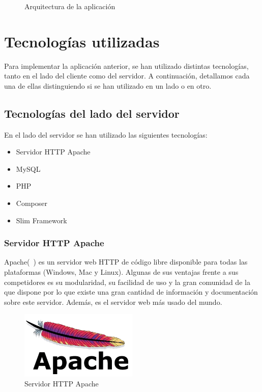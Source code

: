 \begin{figure}[htb]
\centering
\arquitectura
\caption{Arquitectura de la aplicación}
\label{fig:arquitectura}
\end{figure}

\section{Tecnologías utilizadas}

Para implementar la aplicación anterior, se han utilizado distintas tecnologías, tanto en el lado del cliente como del servidor. A continuación, detallamos cada una de ellas distinguiendo si se han utilizado en un lado o en otro.

\subsection{Tecnologías del lado del servidor}

En el lado del servidor se han utilizado las siguientes tecnologías:

\begin{itemize}
\item Servidor HTTP Apache
\item MySQL
\item PHP
\item Composer
\item Slim Framework
\end{itemize}

\subsubsection*{Servidor HTTP Apache}

Apache(~\cite{apache}) es un servidor web HTTP de código libre disponible para todas las plataformas (Windows, Mac y Linux). Algunas de sus ventajas frente a sus competidores es su modularidad, su facilidad de uso y la gran comunidad de la que dispone por lo que existe una gran cantidad de información y documentación sobre este servidor. Además, es el servidor web más usado del mundo.

\begin{figure}[tbh]
\centering
\label{fig:apache}
\includegraphics[width=0.5\textwidth]{imagenes/apache}
\caption{Servidor HTTP Apache}
\end{figure}

